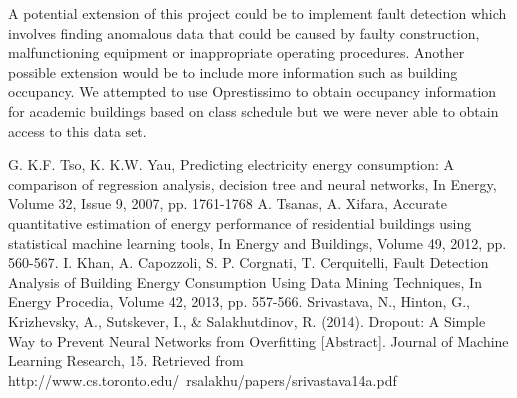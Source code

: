 \documentclass[letterpaper, 11 pt, conference]{ieeeconf}  %
\begin{document}
A potential extension of this project could be to implement fault detection which involves finding anomalous data that could be caused by faulty construction, malfunctioning equipment or inappropriate operating procedures. Another possible extension would be to include more information such as building occupancy. We attempted to use Oprestissimo to obtain occupancy information for academic buildings based on class schedule but we were never able to obtain access to this data set.


\addtolength{\textheight}{-12cm}   %





\begin{thebibliography}{99}

 G. K.F. Tso, K. K.W. Yau, Predicting electricity energy consumption: A comparison of regression analysis, decision tree and neural networks, In Energy, Volume 32, Issue 9, 2007, pp. 1761-1768
 A. Tsanas, A. Xifara, Accurate quantitative estimation of energy performance of residential buildings using statistical machine learning tools, In Energy and Buildings, Volume 49, 2012, pp. 560-567.
 I. Khan, A. Capozzoli, S. P. Corgnati, T. Cerquitelli, Fault Detection Analysis of Building Energy Consumption Using Data Mining Techniques, In Energy Procedia, Volume 42, 2013, pp. 557-566.
 Srivastava, N., Hinton, G., Krizhevsky, A., Sutskever, I., & Salakhutdinov, R. (2014). Dropout: A Simple Way to Prevent Neural Networks from Overfitting [Abstract]. Journal of Machine Learning Research, 15. Retrieved from http://www.cs.toronto.edu/~rsalakhu/papers/srivastava14a.pdf






\end{thebibliography}
\end{document}
